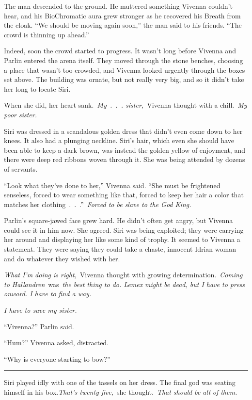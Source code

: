 The man descended to the ground. He muttered something Vivenna couldn’t hear, and his BioChromatic aura grew stronger as he recovered his Breath from the cloak. “We should be moving again soon,” the man said to his friends. “The crowd is thinning up ahead.”

Indeed, soon the crowd started to progress. It wasn’t long before Vivenna and Parlin entered the arena itself. They moved through the stone benches, choosing a place that wasn’t too crowded, and Vivenna looked urgently through the boxes set above. The building was ornate, but not really very big, and so it didn’t take her long to locate Siri.

When she did, her heart sank.~\textit{My~.~.~. sister,}~Vivenna thought with a chill.~\textit{My poor sister.}

Siri was dressed in a scandalous golden dress that didn’t even come down to her knees. It also had a plunging neckline. Siri’s hair, which even she should have been able to keep a dark brown, was instead the golden yellow of enjoyment, and there were deep red ribbons woven through it. She was being attended by dozens of servants.

“Look what they’ve done to her,” Vivenna said. “She must be frightened senseless, forced to wear something like that, forced to keep her hair a color that matches her clothing~.~.~.”~\textit{Forced to be slave to the God King.}

Parlin’s square-jawed face grew hard. He didn’t often get angry, but Vivenna could see it in him now. She agreed. Siri was being exploited; they were carrying her around and displaying her like some kind of trophy. It seemed to Vivenna a statement. They were saying they could take a chaste, innocent Idrian woman and do whatever they wished with her.

\textit{What I’m doing is right,}~Vivenna thought with growing determination.~\textit{Coming to Hallandren}~was~\textit{the best thing to do. Lemex might be dead, but I have to press onward. I have to find a way.}

\textit{I have to save my sister.}

“Vivenna?” Parlin said.

“Hum?” Vivenna asked, distracted.

“Why is everyone starting to bow?”

\bigskip \hrule \bigskip

Siri played idly with one of the tassels on her dress. The final god was seating himself in his box.\textit{That’s twenty-five,}~she thought.~\textit{That should be all of them.}

